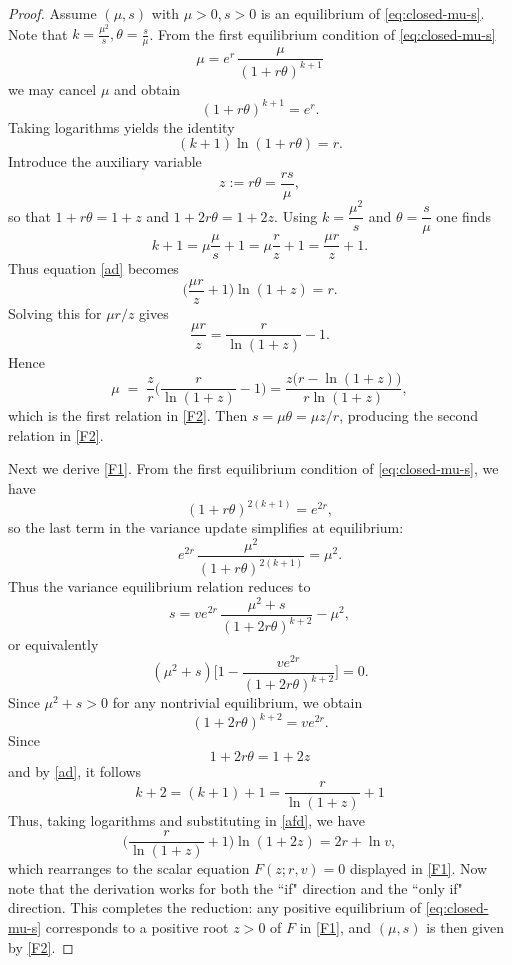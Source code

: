 \documentclass[12pt]{article}
\theoremstyle{definition}
\begin{document}
\begin{proof}
Assume $(\mu, s)$ with \(\mu>0,s>0\) is an equilibrium of \eqref{eq:closed-mu-s}. Note that $k=\frac{\mu^2}{s}, \theta=\frac{s}{\mu}$. From the first equilibrium condition of \eqref{eq:closed-mu-s} 
\[
\mu = e^{r}\,\frac{\mu}{(1 + r\theta)^{k+1}}
\]
we may cancel \(\mu\) and obtain
\[
(1 + r\theta)^{k+1} = e^{r}.
\]
Taking logarithms yields the identity
\begin{equation}\label{ad}
(k+1)\ln(1+r\theta) = r. 
\end{equation}
Introduce the auxiliary variable
\[
z := r\theta = \frac{r s}{\mu},
\]
so that \(1+r\theta=1+z\) and \(1+2r\theta=1+2z\).  Using \(k=\dfrac{\mu^2}{s}\) and \(\theta=\dfrac{s}{\mu}\) one finds
\[
k+1 = \mu \frac{\mu}{s}+1 = \mu \frac{r}{z}+1= \frac{\mu r}{z}+1.
\]
Thus equation \eqref{ad} becomes
\[
\Big(\frac{\mu r}{z}+1\Big)\ln(1+z) = r.
\]
Solving this for \(\mu r/z\) gives
\[
\frac{\mu r}{z} = \frac{r}{\ln(1+z)} - 1.
\]
Hence
\[
\mu \;=\; \frac{z}{r}\Big(\frac{r}{\ln(1+z)} - 1\Big)
= \frac{z\big(r-\ln(1+z)\big)}{r\ln(1+z)},
\]
which is the first relation in \eqref{F2}. Then \(s=\mu\theta=\mu z/r\), producing the second relation in  \eqref{F2}.

Next we derive \eqref{F1}.  From the first equilibrium condition of \eqref{eq:closed-mu-s}, we have
\[
(1 + r\theta)^{2(k+1)} = e^{2r},
\]
so the last term in the variance update simplifies at equilibrium:
\[
e^{2r}\,\frac{\mu^2}{(1 + r\theta)^{2(k+1)}} = \mu^2.
\]
Thus the variance equilibrium relation reduces to
\[
s = v e^{2r}\,\frac{\mu^2+s}{(1+2r\theta)^{k+2}} - \mu^2,
\]
or equivalently
\[
(\mu^2+s)\Big[1 - \frac{v e^{2r}}{(1+2r\theta)^{k+2}}\Big] = 0.
\]
Since \(\mu^2+s>0\) for any nontrivial equilibrium, we obtain
\begin{equation}\label{afd}
(1+2r\theta)^{k+2} = v e^{2r}.
\end{equation}
Since  $$1+2r\theta=1+2z$$  and by \eqref{ad}, it follows  
$$k+2 = (k+1)+1 = \dfrac{r}{\ln(1+z)}+1$$
Thus, taking logarithms and substituting in \eqref{afd}, we have 
\[
\Big(\frac{r}{\ln(1+z)}+1\Big)\ln(1+2z) = 2r + \ln v,
\]
which rearranges to the scalar equation \(F(z;r,v)=0\) displayed in \eqref{F1}. Now note that the derivation works for both the ``if" direction and the ``only if" direction. This completes the reduction: any positive equilibrium of  \eqref{eq:closed-mu-s} corresponds to a positive root \(z>0\) of \(F\) in  \eqref{F1}, and \((\mu,s)\) is then given by \eqref{F2}.
\end{proof}
\end{document}
